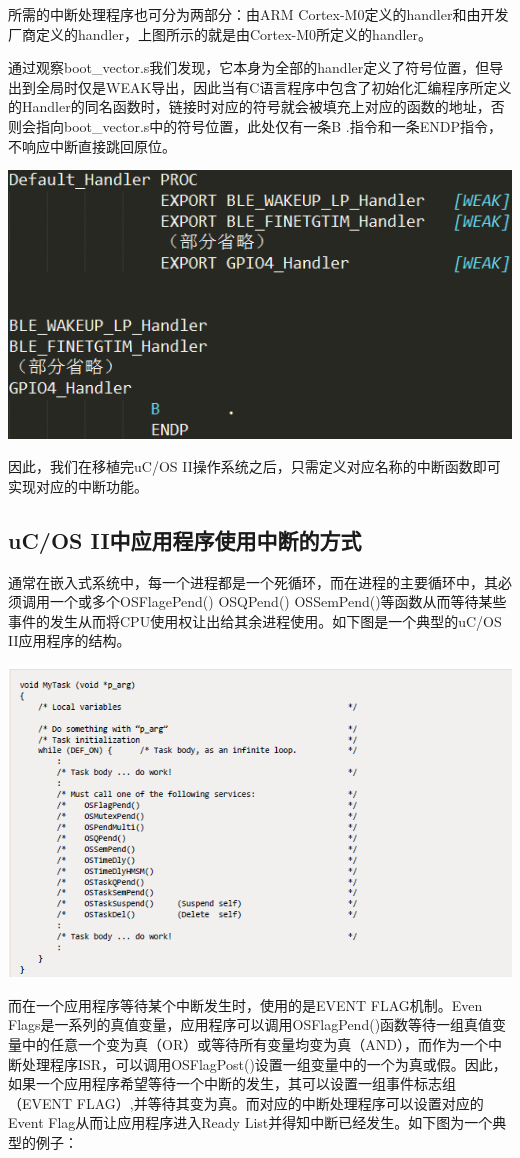 \documentclass{ctexart}
\begin{document}
所需的中断处理程序也可分为两部分：由ARM Cortex-M0定义的handler和由开发厂商定义的handler，上图所示的就是由Cortex-M0所定义的handler。

通过观察boot\_vector.s我们发现，它本身为全部的handler定义了符号位置，但导出到全局时仅是WEAK导出，因此当有C语言程序中包含了初始化汇编程序所定义的Handler的同名函数时，链接时对应的符号就会被填充上对应的函数的地址，否则会指向boot\_vector.s中的符号位置，此处仅有一条B .指令和一条ENDP指令，不响应中断直接跳回原位。

\centerline{\includegraphics[scale=0.75]{007}}\par

因此，我们在移植完uC/OS II操作系统之后，只需定义对应名称的中断函数即可实现对应的中断功能。
\subsection{uC/OS II中应用程序使用中断的方式}
通常在嵌入式系统中，每一个进程都是一个死循环，而在进程的主要循环中，其必须调用一个或多个OSFlagePend() OSQPend() OSSemPend()等函数从而等待某些事件的发生从而将CPU使用权让出给其余进程使用。如下图是一个典型的uC/OS II应用程序的结构。

\centerline{\includegraphics[scale=0.75]{008}}\par
而在一个应用程序等待某个中断发生时，使用的是EVENT FLAG机制。Even Flags是一系列的真值变量，应用程序可以调用OSFlagPend()函数等待一组真值变量中的任意一个变为真（OR）或等待所有变量均变为真（AND），而作为一个中断处理程序ISR，可以调用OSFlagPost()设置一组变量中的一个为真或假。因此，如果一个应用程序希望等待一个中断的发生，其可以设置一组事件标志组（EVENT FLAG）,并等待其变为真。而对应的中断处理程序可以设置对应的Event Flag从而让应用程序进入Ready List并得知中断已经发生。如下图为一个典型的例子：
\end{document}
